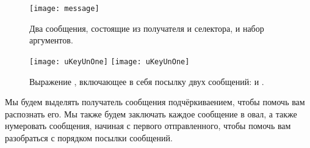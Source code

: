 \documentclass[a4paper,10pt,twoside]{book}
\begin{document}
\begin{figure}[htb]
\begin{minipage}{0.53\textwidth}
	\begin{center}
	\texttt{[image: message]}
	\caption{Два сообщения, состоящие из получателя и селектора, и набор аргументов.}\end{center}
\end{minipage}
\hfill
\begin{minipage}{0.43\textwidth}
	\begin{center}
	\ifluluelse
		{\texttt{[image: uKeyUnOne]}}
		{\texttt{[image: uKeyUnOne]}}
	\caption{Выражение , включающее в себя посылку двух сообщений:  и .}
	\end{center}
\end{minipage}
\end{figure}


Мы будем выделять получатель сообщения подчёркиваением, чтобы помочь вам распознать его.
Мы также будем заключать каждое сообщение в овал, а также нумеровать сообщения, начиная с первого отправленного, чтобы помочь вам разобраться с порядком посылки сообщений.

\end{document}
